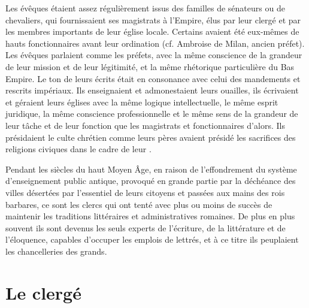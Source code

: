  Les évêques étaient assez régulièrement issus des familles de sénateurs ou de chevaliers, qui fournissaient ses magistrats à l'Empire, élus par leur clergé et par les membres importants de leur église locale. Certains avaient été eux-mêmes de hauts fonctionnaires avant leur ordination (cf. Ambroise de Milan, ancien préfet). Les évêques parlaient comme les préfets, avec la même conscience de la grandeur de leur mission et de leur légitimité, et la même rhétorique particulière du Bas Empire. Le ton de leurs écrits était en consonance avec celui des mandements et rescrits impériaux. Ils enseignaient et admonestaient leurs ouailles, ils écrivaient et géraient leurs églises avec la même logique intellectuelle, le même esprit juridique, la même conscience professionnelle et le même sens de la grandeur de leur tâche et de leur fonction que les magistrats et fonctionnaires d'alors. Ils présidaient le culte chrétien comme leurs pères avaient présidé les sacrifices des religions civiques dans le cadre de leur . 

 Pendant les siècles du haut Moyen Âge, en raison de l'effondrement du système d'enseignement public antique, provoqué en grande partie par la déchéance des villes désertées par l'essentiel de leurs citoyens et passées aux mains des rois barbares, ce sont les clercs qui ont tenté avec plus ou moins de succès de maintenir les traditions littéraires et administratives romaines. De plus en plus souvent ils sont devenus les seuls experts de l'écriture, de la littérature et de l'éloquence, capables d'occuper les emplois de lettrés, et à ce titre ils peuplaient les chancelleries des grands.

\section{Le clergé}

